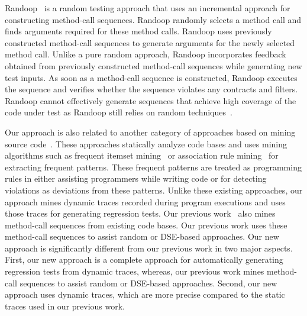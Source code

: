 Randoop~\cite{pacheco:feedback} is a random testing approach that uses an incremental approach for constructing method-call sequences. Randoop randomly selects a method call and finds arguments required for these method calls. Randoop uses previously constructed method-call sequences to generate arguments for the newly selected method call. Unlike a pure random approach, Randoop incorporates feedback obtained from previously constructed method-call sequences while generating new test inputs. As soon as a method-call sequence is constructed, Randoop executes the sequence and verifies whether the sequence violates any contracts and filters. Randoop cannot effectively generate sequences that achieve high coverage of the code under test as Randoop still relies on random techniques~\cite{thummalapenta09:mseqgen}.

Our approach is also related to another category of approaches based on mining source code~\cite{Engler2001deviant, acharya06:mining, wasylkowski07:detecting, thummalapenta07:parseweb, thummalapenta09:mining, thummalapenta09:mseqgen}. These approaches statically analyze code bases and uses mining algorithms such as 
frequent itemset mining~\cite{wang:bide} or association rule mining~\cite{agarwal:association} for extracting frequent patterns. These frequent patterns are treated as programming rules in either assisting programmers while writing code or for detecting violations as deviations from these patterns. Unlike these existing approaches, our approach mines dynamic traces recorded during program executions and uses those traces for generating regression tests. Our previous work~\cite{thummalapenta09:mseqgen} also mines method-call sequences from existing code bases. Our previous work uses these method-call sequences to assist random or DSE-based approaches. Our new approach is significantly different from our previous work in two major aspects. First, our new approach is a complete approach for automatically generating regression tests from dynamic traces, whereas, our previous work mines method-call sequences to assist random or DSE-based approaches. Second, our new approach uses dynamic traces, which are more precise compared to the static traces used in our previous work.
